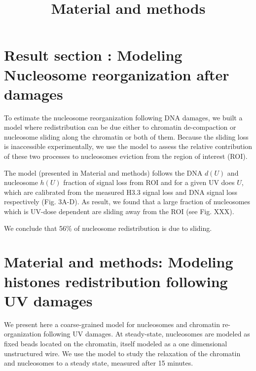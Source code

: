 \documentclass[12pt]{article}
\begin{document}
	
\title{ Material and methods}
\maketitle
\section{Result section : Modeling Nucleosome reorganization after damages}
To estimate the nucleosome reorganization following DNA damages, we built a model where redistribution can be due either to chromatin de-compaction or nucleosome sliding along the chromatin or both of them.  Because the sliding loss is inaccessible experimentally, we use the model to assess the relative contribution of these two processes to nucleosomes eviction from the region of interest (ROI).

The model (presented in Material and methods) follows the DNA $d(U)$ and nucleosome $h(U)$ fraction of signal loss from ROI and for a given UV does $U$, which are calibrated from the measured  H3.3 signal loss and DNA signal loss respectively (Fig. 3A-D). As result, we found that a large fraction of nucleosomes which is UV-dose dependent are sliding away from the ROI (see Fig. XXX).

We conclude that 56\% of nucleosome redistribution is due to sliding.


\section{Material and methods: Modeling  histones redistribution following UV damages}
We present here a coarse-grained model for nucleosomes and chromatin re-organization following UV damages. At steady-state, nucleosomes are modeled as fixed beads located on the chromatin, itself modeled as a one dimensional unstructured wire. We use the model to study the relaxation of the chromatin and nucleosomes to a steady state, measured after 15 minutes.
\end{document}
